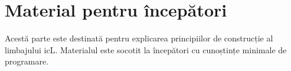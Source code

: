 \part{Material pentru începători}

Acestă parte este destinată pentru explicarea principiilor de construcție al limbajului icL. Materialul este socotit la începători cu cunoștințe minimale de programare.
